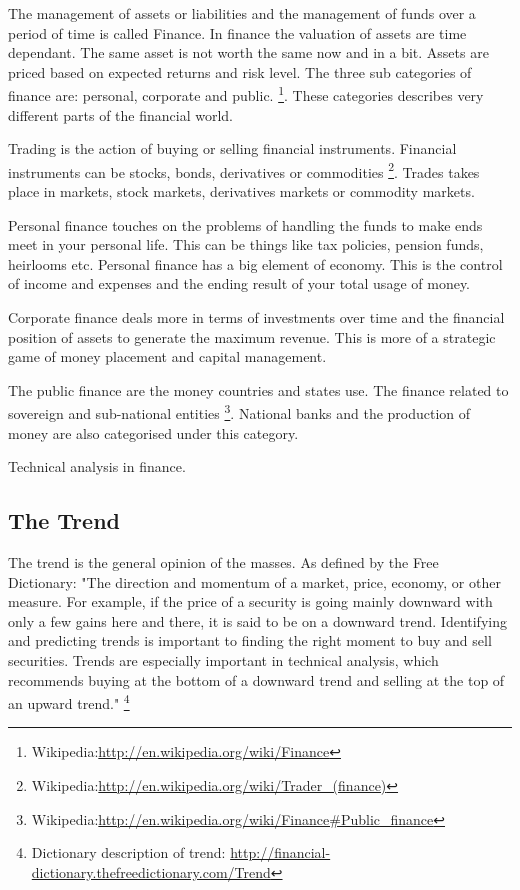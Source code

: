 
The management of assets or liabilities and the management of funds over a
period of time is called Finance. In finance the valuation of assets are time
dependant. The same asset is not worth the same now and in a bit. Assets are
priced based on expected returns and risk level. The three sub categories of
finance are: personal, corporate and public. 
\footnote{Wikipedia:\url{http://en.wikipedia.org/wiki/Finance}}.
These categories describes very different parts of the financial world. 

Trading is the action of buying or selling financial instruments.
Financial instruments can be stocks, bonds, derivatives or commodities 
\footnote{Wikipedia:\url{http://en.wikipedia.org/wiki/Trader_(finance)}}.
Trades takes place in markets,  stock markets, derivatives markets or commodity
markets.

Personal finance touches on the problems of handling the funds to make ends
meet in your personal life. This can be things like tax policies, pension
funds, heirlooms etc. Personal finance has a big element of economy. This is
the control of income and expenses and the ending result of your total usage of
money.  

Corporate finance deals more in terms of investments over time and the
financial position of assets to generate the maximum revenue. This is more of a
strategic game of money placement and capital management. 

The public finance are the money countries and states use. The finance related
to sovereign and sub-national entities
\footnote{Wikipedia:\url{http://en.wikipedia.org/wiki/Finance#Public_finance}}.
National banks and the production of money are also categorised under this
category.

Technical analysis in finance. 

\subsection{The Trend}
The trend is the general opinion of the masses. As defined by the Free
Dictionary:  
"The direction and momentum of a market, price, economy, or other measure. For
example, if the price of a security is going mainly downward with only a few
gains here and there, it is said to be on a downward trend. Identifying and
predicting trends is important to finding the right moment to buy and sell
securities. Trends are especially important in technical analysis, which
recommends buying at the bottom of a downward trend and selling at the top of an
upward trend."
\footnote{Dictionary description of trend: \url{http://financial-dictionary.thefreedictionary.com/Trend}}

